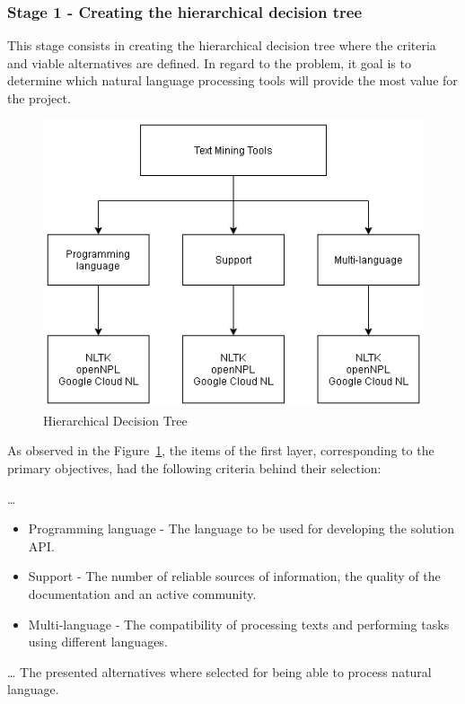 \subsubsection{Stage 1 - Creating the hierarchical decision tree}

This stage consists in creating the hierarchical decision tree where the criteria and viable alternatives are defined.
In regard to the problem, it goal is to determine which natural language processing tools will provide the most value for the project.

\begin{figure}[H]
\centering
\includegraphics[scale=0.5]{ch3/assets/AHP.png}
\caption[Hierarchical Decision Tree]{Hierarchical Decision Tree}
\label{fig:AHP}
\end{figure}

As observed in the Figure~\ref{fig:AHP}, the items of the first layer, corresponding to the primary objectives, had the following criteria behind their selection:

\dots %
\begin{itemize}
    \item Programming language - The language to be used for developing the solution \gls{API}.
    \item Support - The number of reliable sources of information, the quality of the documentation and an active community.
    \item Multi-language - The compatibility of processing texts and performing tasks using different languages.
\end{itemize}

\dots %
The presented alternatives where selected for being able to process natural language.

